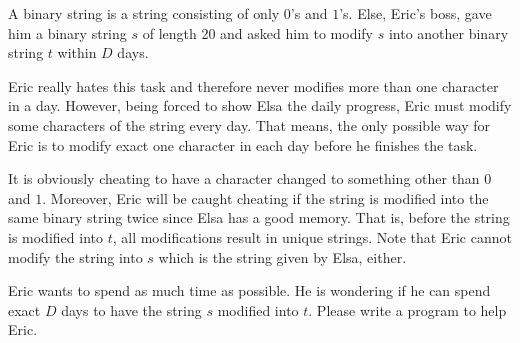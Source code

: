 A binary string is a string consisting of only $0$'s and $1$'s. 
Else, Eric's boss, gave him a binary string $s$ of length 20 and
asked him to modify $s$ into another binary string $t$ within $D$ days.

Eric really hates this task and therefore never modifies more than one 
character in a day.
However, being forced to show Elsa the daily progress,
Eric must modify some characters of the string every day.
That means, the only possible way for Eric is to modify exact one character 
in each day before he finishes the task.

It is obviously cheating to have a character changed to something other than 
$0$ and $1$.
Moreover, Eric will be caught cheating if the string is modified into the same
binary string twice since Elsa has a good memory.
That is, before the string is modified into $t$, all modifications result in
unique strings.
Note that Eric cannot modify the string into $s$ which is the string given by 
Elsa, either.

Eric wants to spend as much time as possible. 
He is wondering if he can spend exact $D$ days to have the string $s$
modified into $t$.
Please write a program to help Eric.
